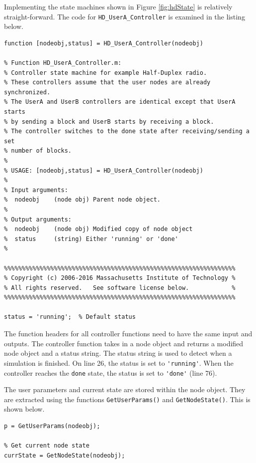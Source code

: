 Implementing the state machines shown in Figure \ref{fig:hdState} is
relatively straight-forward.  The code for
\verb+HD_UserA_Controller+ is examined in the listing below.

\begin{lstlisting}[name=hdState]
function [nodeobj,status] = HD_UserA_Controller(nodeobj)

% Function HD_UserA_Controller.m:
% Controller state machine for example Half-Duplex radio.  
% These controllers assume that the user nodes are already synchronized.  
% The UserA and UserB controllers are identical except that UserA starts 
% by sending a block and UserB starts by receiving a block.  
% The controller switches to the done state after receiving/sending a set 
% number of blocks.
%
% USAGE: [nodeobj,status] = HD_UserA_Controller(nodeobj)
%
% Input arguments:
%  nodeobj    (node obj) Parent node object.  
%
% Output arguments:
%  nodeobj    (node obj) Modified copy of node object
%  status     (string) Either 'running' or 'done'
%

%%%%%%%%%%%%%%%%%%%%%%%%%%%%%%%%%%%%%%%%%%%%%%%%%%%%%%%%%%%%%%%%%
% Copyright (c) 2006-2016 Massachusetts Institute of Technology %
% All rights reserved.   See software license below.            %
%%%%%%%%%%%%%%%%%%%%%%%%%%%%%%%%%%%%%%%%%%%%%%%%%%%%%%%%%%%%%%%%%

status = 'running';  % Default status

\end{lstlisting}

The function headers for all controller functions need to have the
same input and outputs.  The controller function takes in a node
object and returns a modified node object and a status string.  The
status string is used to detect when a simulation is finished.  On
line 26, the status is set to \verb+'running'+.  When the controller
reaches the \verb+done+ state, the status is set to \verb+'done'+
(line 76).

The user parameters and current state are stored within the node
object.  They are extracted using the functions
\verb+GetUserParams()+ and \verb+GetNodeState()+.  This is shown
below.

\begin{lstlisting}[name=hdState]
% Load user parameters
p = GetUserParams(nodeobj);

% Get current node state
currState = GetNodeState(nodeobj);

\end{lstlisting}

